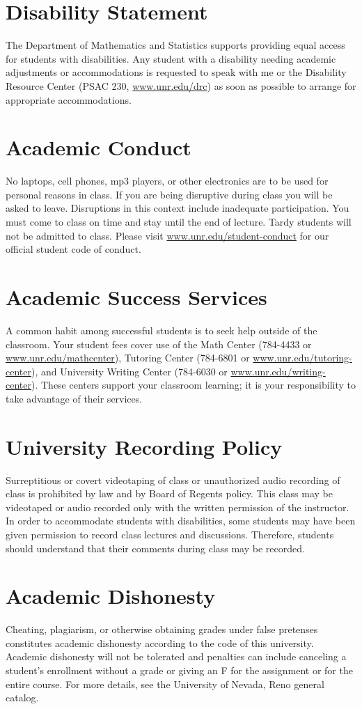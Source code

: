\documentclass[11pt,onecolumn]{article}
\begin{document}
\section*{Disability Statement}
The Department of Mathematics and Statistics supports providing equal access for students with disabilities. Any student with a disability needing academic adjustments or accommodations is requested to speak with me or the Disability Resource Center (PSAC 230, \url{www.unr.edu/drc}) as soon as possible to arrange for appropriate accommodations.

\section*{Academic Conduct}
No laptops, cell phones, mp3 players, or other electronics are to be used for personal reasons in class. If you are being disruptive during class you will be asked to leave. Disruptions in this context include inadequate participation. You must come to class on time and stay until the end of lecture. Tardy students will not be admitted to class. Please visit \url{www.unr.edu/student-conduct} for our official student code of conduct.

\section*{Academic Success Services}
A common habit among successful students is to seek help outside of the classroom. Your student fees cover use of the Math Center (784-4433 or \url{www.unr.edu/mathcenter}), Tutoring Center (784-6801 or \url{www.unr.edu/tutoring-center}), and University Writing Center (784-6030 or \url{www.unr.edu/writing-center}). These centers support your classroom learning; it is your responsibility to take advantage of their services.

\section*{University Recording Policy}
Surreptitious or covert videotaping of class or unauthorized audio recording of class is prohibited by law and by Board of Regents policy. This class may be videotaped or audio recorded only with the written permission of the instructor. In order to accommodate students with disabilities, some students may have been given permission to record class lectures and discussions. Therefore, students should understand that their comments during class may be recorded.

\section*{Academic Dishonesty}
Cheating, plagiarism, or otherwise obtaining grades under false pretenses constitutes academic dishonesty according to the code of this university. Academic dishonesty will not be tolerated and penalties can include canceling a student’s enrollment without a grade or giving an F for the assignment or for the entire course. For more details, see the University of Nevada, Reno general catalog.
\end{document}
